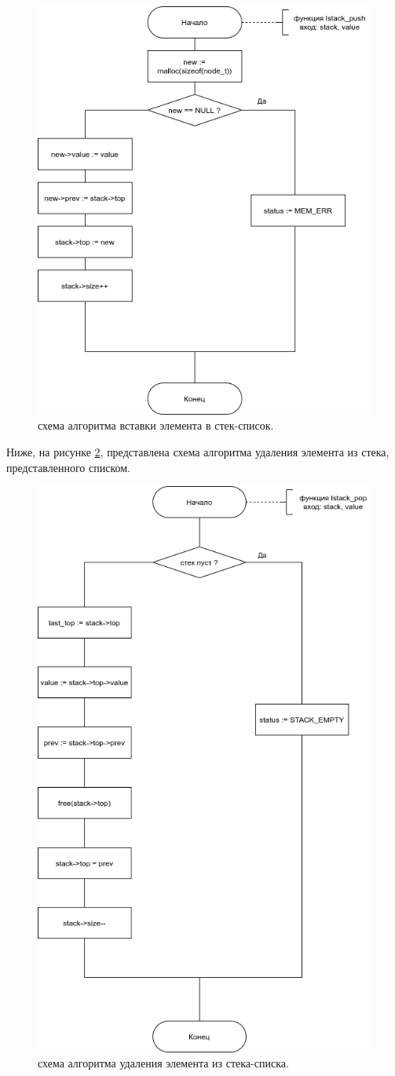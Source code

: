 \begin{figure}[h]
	\centering
	\includegraphics[width=0.6\linewidth]{img/algo-lstack_push.png}
	\caption{схема алгоритма вставки элемента в стек-список.}
	\label{alg:lpush}
\end{figure}

\clearpage

Ниже, на рисунке \ref{alg:lpop}, представлена схема алгоритма удаления элемента из стека, представленного списком.

\begin{figure}[h]
	\centering
	\includegraphics[width=0.6\linewidth]{img/algo-lstack_pop.png}
	\caption{схема алгоритма удаления элемента из стека-списка.}
	\label{alg:lpop}
\end{figure}

